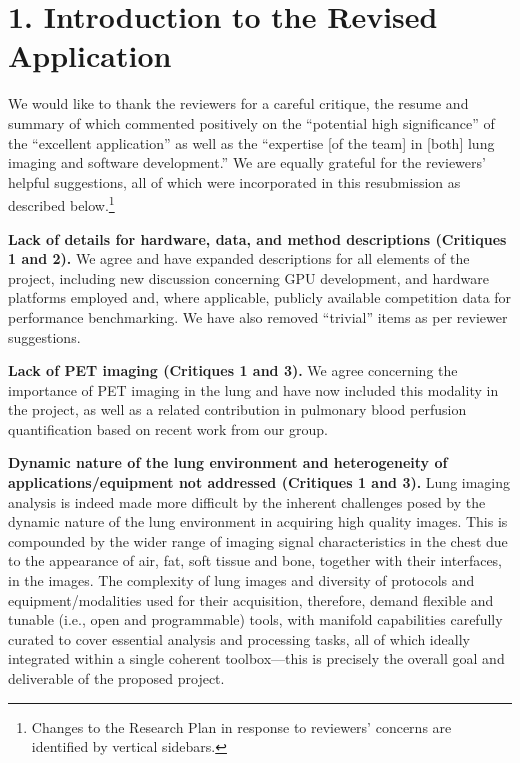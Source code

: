 \documentclass[11pt,]{article}
\title{}
\author{}
\date{}
\let\rmarkdownfootnote\footnote%
\def\footnote{\protect\rmarkdownfootnote}
\begin{document}
\maketitle


\section{1. Introduction to the Revised
Application}\label{introduction-to-the-revised-application}

We would like to thank the reviewers for a careful critique, the resume
and summary of which commented positively on the ``potential high
significance'' of the ``excellent application'' as well as the
``expertise {[}of the team{]} in {[}both{]} lung imaging and software
development.'' We are equally grateful for the reviewers' helpful
suggestions, all of which were incorporated in this resubmission as
described below.\footnote{Changes to the Research Plan in response to
  reviewers' concerns are identified by vertical sidebars.}

\textbf{Lack of details for hardware, data, and method descriptions
(Critiques 1 and 2). } We agree and have expanded descriptions for all
elements of the project, including new discussion concerning GPU
development, and hardware platforms employed and, where applicable,
publicly available competition data for performance benchmarking. We
have also removed ``trivial'' items as per reviewer suggestions.

\textbf{Lack of PET imaging (Critiques 1 and 3).} We agree concerning
the importance of PET imaging in the lung and have now included this
modality in the project, as well as a related contribution in pulmonary
blood perfusion quantification based on recent work from our group.

\textbf{Dynamic nature of the lung environment and heterogeneity of
applications/equipment not addressed (Critiques 1 and 3).} Lung imaging
analysis is indeed made more difficult by the inherent challenges posed
by the dynamic nature of the lung environment in acquiring high quality
images. This is compounded by the wider range of imaging signal
characteristics in the chest due to the appearance of air, fat, soft
tissue and bone, together with their interfaces, in the images. The
complexity of lung images and diversity of protocols and
equipment/modalities used for their acquisition, therefore, demand
flexible and tunable (i.e., open and programmable) tools, with manifold
capabilities carefully curated to cover essential analysis and
processing tasks, all of which ideally integrated within a single
coherent toolbox---this is precisely the overall goal and deliverable of
the proposed project.
\end{document}
